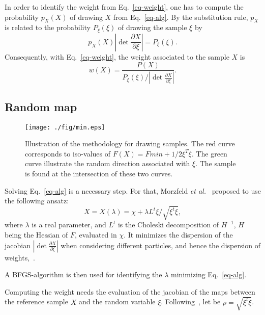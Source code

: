 \documentclass[aip,pof,nofootinbib,reprint,onecolumn]{revtex4-1}
\newcommand{\mypar}[1]{\left(#1\right)}
\newcommand{\rpoint}{X}
\begin{document}
In order to identify the weight from Eq.~\eqref{eq-weight}, one has to compute the probability $p_{\rpoint}\mypar{\rpoint}$ of drawing $X$ from Eq.~\eqref{eq-alg}.
By the substitution rule, $p_X$ is related to the probability $P_{\xi}\mypar{\xi}$ of drawing the sample $\xi$ by
$$
p_{\rpoint}\mypar{\rpoint} \left|\det \frac{\partial \rpoint}{\partial \xi}\right|  = P_{\xi}\mypar{\xi}.
$$
Consequently, with Eq.~\eqref{eq-weight}, the weight associated to the sample $\rpoint$ is
\begin{equation}
w\mypar{\rpoint} = \frac{P\mypar{\rpoint}}{P_{\xi}\mypar{\xi}/\left|\det \frac{\partial \rpoint}{\partial \xi}\right|}.
\label{eq-weight_dev}
\end{equation}




\subsection{Random map}
\begin{figure}[t]
\center
\texttt{[image: ./fig/min.eps]}
\caption{\small Illustration of the methodology for drawing samples. The red curve corresponds to iso-values of $F\mypar{\rpoint} = Fmin+1/2 \xi^T\xi$. The green curve illustrate the random direction associated with $\xi$. The sample is found at the intersection of these two curves.}
\label{fig-rmap}
\end{figure}

Solving Eq.~\eqref{eq-alg} is a necessary step. For that, Morzfeld \emph{et al.}~\cite{Morzfeld2012} proposed to use the following ansatz:
\begin{equation}
\rpoint = \rpoint\mypar{\lambda} = \chi + \lambda L^t \xi/\sqrt{\xi^t \xi},
\label{eq-ansatz}
\end{equation}
where $\lambda$ is a real parameter, and $L^t$ is the Choleski decomposition of $H^{-1}$, $H$ being the Hessian of $F$, evaluated in $\chi$.
It minimizes the dispersion of the jacobian $\left|\det \frac{\partial \rpoint}{\partial \xi}\right|$ when considering different particles, and hence the dispersion of weights,~\citep{Morzfeld2012}.

A BFGS-algorithm is then used for identifying the $\lambda$ minimizing Eq.~\eqref{eq-alg}.

Computing the weight needs the evaluation of the jacobian of the maps between the reference sample $\rpoint$ and the random variable $\xi$.
Following~\citep{Morzfeld2012}, let be $\rho = \sqrt{\xi^t \xi}$.
\end{document}
